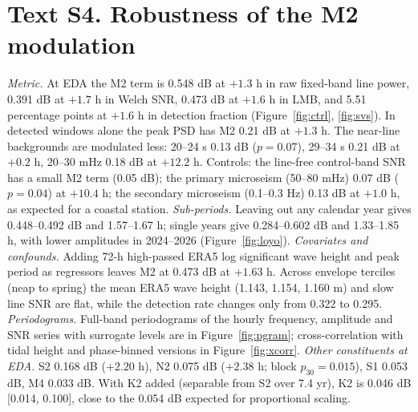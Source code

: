 \documentclass[11pt]{article}
\begin{document}
\section*{Text S4. Robustness of the M2 modulation}
\textit{Metric.} At EDA the M2 term is 0.548 dB at $+1.3$ h in raw fixed-band line power, 0.391 dB at $+1.7$ h in Welch SNR, 0.473 dB at $+1.6$ h in LMB, and 5.51 percentage points at $+1.6$ h in detection fraction (Figure~\ref{fig:ctrl}, \ref{fig:svs}). In detected windows alone the peak PSD has M2 0.21 dB at $+1.3$ h. The near-line backgrounds are modulated less: 20--24 s 0.13 dB ($p=0.07$), 29--34 s 0.21 dB at $+0.2$ h, 20--30 mHz 0.18 dB at $+12.2$ h. Controls: the line-free control-band SNR has a small M2 term (0.05 dB); the primary microseism (50--80 mHz) 0.07 dB ($p=0.04$) at $+10.4$ h; the secondary microseism (0.1--0.3 Hz) 0.13 dB at $+1.0$ h, as expected for a coastal station.
\textit{Sub-periods.} Leaving out any calendar year gives 0.448--0.492 dB and 1.57--1.67 h; single years give 0.284--0.602 dB and 1.33--1.85 h, with lower amplitudes in 2024--2026 (Figure~\ref{fig:loyo}).
\textit{Covariates and confounds.} Adding 72-h high-passed ERA5 log significant wave height and peak period as regressors leaves M2 at 0.473 dB at $+1.63$ h. Across envelope terciles (neap to spring) the mean ERA5 wave height (1.143, 1.154, 1.160 m) and slow line SNR are flat, while the detection rate changes only from 0.322 to 0.295.
\textit{Periodograms.} Full-band periodograms of the hourly frequency, amplitude and SNR series with surrogate levels are in Figure~\ref{fig:pgram}; cross-correlation with tidal height and phase-binned versions in Figure~\ref{fig:xcorr}.
\textit{Other constituents at EDA.} S2 0.168 dB ($+2.20$ h), N2 0.075 dB ($+2.38$ h; block $p_{30}=0.015$), S1 0.053 dB, M4 0.033 dB. With K2 added (separable from S2 over 7.4 yr), K2 is 0.046 dB [0.014, 0.100], close to the 0.054 dB expected for proportional scaling.
\end{document}
